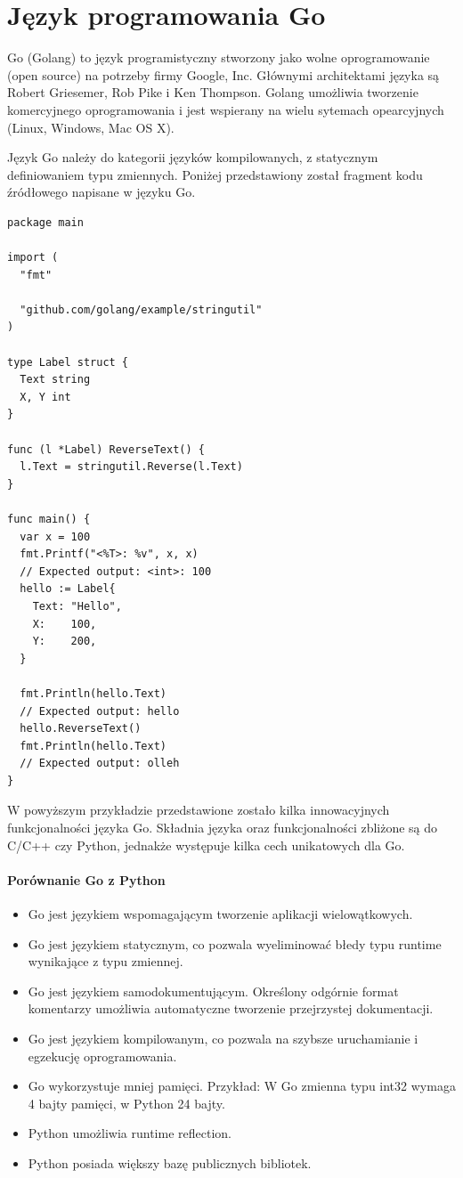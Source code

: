 \documentclass[a4paper,12pt,twoside,openany]{report}
\begin{document}
\section{Język programowania Go}
Go (Golang) to język programistyczny stworzony jako wolne oprogramowanie (open source) na potrzeby firmy Google, Inc. 
Głównymi architektami języka są Robert Griesemer, Rob Pike i Ken Thompson.
Golang umożliwia tworzenie komercyjnego oprogramowania i jest wspierany na wielu sytemach opearcyjnych (Linux, Windows, Mac OS X).

Język Go należy do kategorii języków kompilowanych, z statycznym definiowaniem typu zmiennych. 
Poniżej przedstawiony został fragment kodu źródłowego napisane w języku Go.

\begin{lstlisting}
package main

import (
  "fmt"

  "github.com/golang/example/stringutil"
)

type Label struct {
  Text string
  X, Y int
}

func (l *Label) ReverseText() {
  l.Text = stringutil.Reverse(l.Text)
}

func main() {
  var x = 100
  fmt.Printf("<%T>: %v", x, x)
  // Expected output: <int>: 100
  hello := Label{
    Text: "Hello",
    X:    100,
    Y:    200,
  }
  
  fmt.Println(hello.Text)
  // Expected output: hello
  hello.ReverseText()
  fmt.Println(hello.Text)
  // Expected output: olleh
}

\end{lstlisting}

W powyższym przykładzie przedstawione zostało kilka innowacyjnych funkcjonalności języka Go.
Składnia języka oraz funkcjonalności zbliżone są do C/C++ czy Python, jednakże występuje kilka cech unikatowych dla Go.

\paragraph{Porównanie Go z Python}
\begin{itemize}
 \item Go jest językiem wspomagającym tworzenie aplikacji wielowątkowych.
 \item Go jest językiem statycznym, co pozwala wyeliminować błedy typu runtime wynikające z typu zmiennej.
 \item Go jest językiem samodokumentującym. Określony odgórnie format komentarzy umożliwia automatyczne tworzenie przejrzystej dokumentacji.
 \item Go jest językiem kompilowanym, co pozwala na szybsze uruchamianie i egzekucję oprogramowania.
 \item Go wykorzystuje mniej pamięci. Przykład: W Go zmienna typu int32 wymaga 4 bajty pamięci, w Python 24 bajty.
 \item Python umożliwia runtime reflection.
 \item Python posiada większy bazę publicznych bibliotek.
\end{itemize}
\end{document}
